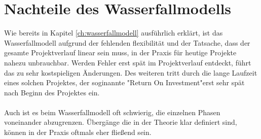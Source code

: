 \documentclass[a4paper, twopage]{scrreprt}
\begin{document}
\section{Nachteile des Wasserfallmodells}
\label{sec:wasserfallmodell_nachteile}
Wie bereits in Kapitel \ref{ch:wasserfallmodell} ausführlich erklärt, ist das Wasserfallmodell aufgrund der fehlenden flexibilität und der Tatsache, dass der gesamte Projektverlauf linear sein muss, in der Praxis für heutige Projekte nahezu unbrauchbar. Werden Fehler erst spät im Projektverlauf entdeckt, führt das zu sehr kostspieligen Änderungen. Des weiteren tritt durch die lange Laufzeit eines solchen Projektes, der soginannte "Return On Investment"\footnotemark erst sehr spät nach Beginn des Projektes ein.
\paragraph*{}
Auch ist es beim Wasserfallmodell oft schwierig, die einzelnen Phasen voneinander abzugrenzen. Übergänge die in der Theorie klar definiert sind, können in der Praxis oftmals eher fließend sein.
\end{document}
